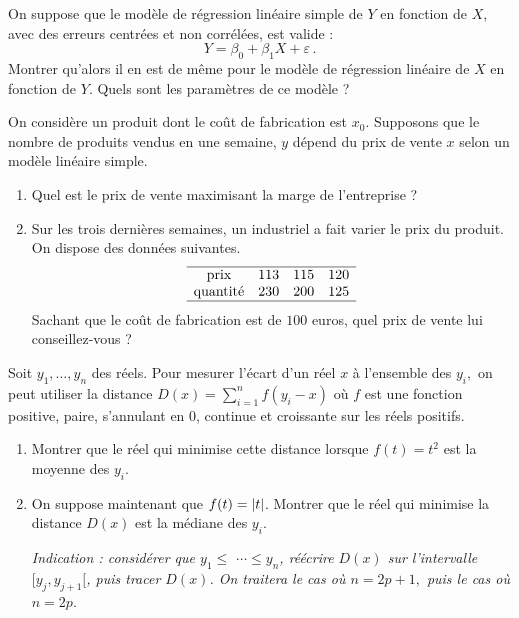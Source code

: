 \documentclass{td_um}
\providecommand{\1}{\mathds{1}}
\begin{document}
	
	\cor{\newpage}
	
	\exo{}
	On suppose que le modèle de régression linéaire simple de $Y$ en fonction de $X$, avec des erreurs centrées et non corrélées, est valide :
	\[
	Y=\beta_{0} + \beta_{1} X + \varepsilon\,.
	\]
	Montrer qu'alors il en est de même pour le modèle de régression linéaire de $X$ en fonction de $Y$. Quels sont les paramètres de ce modèle ?
	
	
	\cor{\newpage}
	
	\exo{}
	On considère un produit dont le coût de fabrication est $x_{0}$. Supposons que le nombre de produits vendus en une semaine, $y$ dépend du prix de vente $x$ selon un modèle linéaire simple.
	\begin{enumerate}
		\item  Quel est le prix de vente maximisant la marge de l'entreprise ?
		\item  Sur les trois dernières semaines, un industriel a fait varier le prix du produit. On dispose des données suivantes.
		\[
		\begin{array}[]{cccc}
			\hline
			\text{prix} & 113 & 115 & 120 \\
			\text{quantité} & 230 & 200 & 125 \\
			\hline
		\end{array}
		\]
		Sachant que le coût de fabrication est de $100$ euros, quel prix de vente lui conseillez-vous ?
	\end{enumerate}
	
	
	\cor{\newpage}
	
	\exo{} 
	Soit $y_{1}, \ldots, y_{n}$ des réels. Pour mesurer l'écart d'un réel $x$ à l'ensemble des $y_{i},$ on peut utiliser la distance $D(x)=\sum_{i=1}^{n} f\left(y_{i}-x\right)$ où $f$ est une fonction positive, paire, s'annulant en 0, continue et croissante sur les réels positifs.
	\begin{enumerate}
		\item Montrer que le réel qui minimise cette distance lorsque $f(t)=t^{2}$ est la moyenne des $y_{i}$.
		\item On suppose maintenant que $f(t)=\left\lvert t\right\rvert$. Montrer que le réel qui minimise la distance $D(x)$ est la médiane des $y_{i}$.
		
		{\it Indication : considérer que $y_{1} \leq$ $\cdots \leq y_{n}$, réécrire $D(x)$ sur l'intervalle $[y_{j}, y_{j+1}[$, puis tracer $D(x)$. On traitera le cas où $n=2 p+1,$ puis le cas où $n=2 p$}.
		
	\end{enumerate}
	
\end{document}
